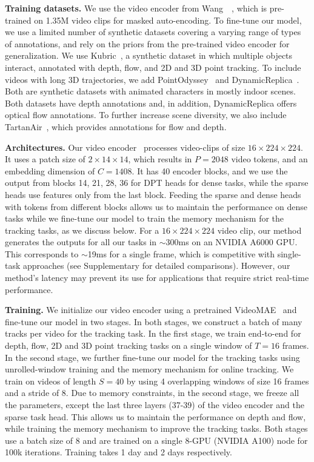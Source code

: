 
\noindent
\textbf{Training datasets.}
We use the video encoder from Wang~\etal~\cite{wang2023videomaev2}, which is pre-trained on 1.35M video clips for masked auto-encoding.
To fine-tune our model, we use a limited number of synthetic datasets covering a varying range of types of annotations, and rely on the priors from the pre-trained video encoder for generalization.
We use Kubric~\cite{greff2022kubric}, a synthetic dataset in which multiple objects interact, annotated with depth, flow, and 2D and 3D point tracking.
To include videos with long 3D trajectories, we add PointOdyssey~\cite{zheng2023pointodyssey} and DynamicReplica~\cite{karaev2023dynamicstereo}.
Both are synthetic datasets with animated characters in mostly indoor scenes.
Both datasets have depth annotations and, in addition, DynamicReplica offers optical flow annotations.
To further increase scene diversity, we also include TartanAir~\cite{tartanair2020iros}, which provides annotations for flow and depth.

\noindent\textbf{Architectures.}
Our video encoder~\cite{wang2023videomaev2} processes video-clips of size $16 \times 224\times224$.
It uses a patch size of $2\times14\times14$, which results in $P=2048$ video tokens, and an embedding dimension of $C=1408$.
It has 40 encoder blocks, and we use the output from blocks 14, 21, 28, 36 for DPT heads for dense tasks, while the sparse heads use features only from the last block.
Feeding the sparse and dense heads with tokens from different blocks allows us to maintain the performance on dense tasks while we fine-tune our model to train the memory mechanism for the tracking tasks, as we discuss below.
For a $16\times224\times224$ video clip, our method generates the outputs for all our tasks in $\sim$300ms on an NVIDIA A6000 GPU.
This corresponds to $\sim$19ms for a single frame, which is competitive with single-task approaches (see Supplementary for detailed comparisons).
However, our method's latency may prevent its use for applications that require strict real-time performance.

\noindent\textbf{Training.}
We initialize our video encoder using a pretrained VideoMAE~\cite{wang2023videomaev2} and fine-tune our model in two stages.
In both stages, we construct a batch of many tracks per video for the tracking task.
In the first stage, we train end-to-end for depth, flow, 2D and 3D point tracking tasks on a single window of $T=16$ frames.
In the second stage, we further fine-tune our model for the tracking tasks using unrolled-window training and the memory mechanism for online tracking.
We train on videos of length $S=40$ by using 4 overlapping windows of size 16 frames and a stride of 8.
Due to memory constraints, in the second stage, we freeze all the parameters, except the last three layers (37-39) of the video encoder and the sparse task head.
This allows us to maintain the performance on depth and flow, while training the memory mechanism to improve the tracking tasks.
Both stages use a batch size of 8 and are trained on a single 8-GPU (NVIDIA A100) node for 100k iterations. Training takes 1 day and 2 days respectively.

